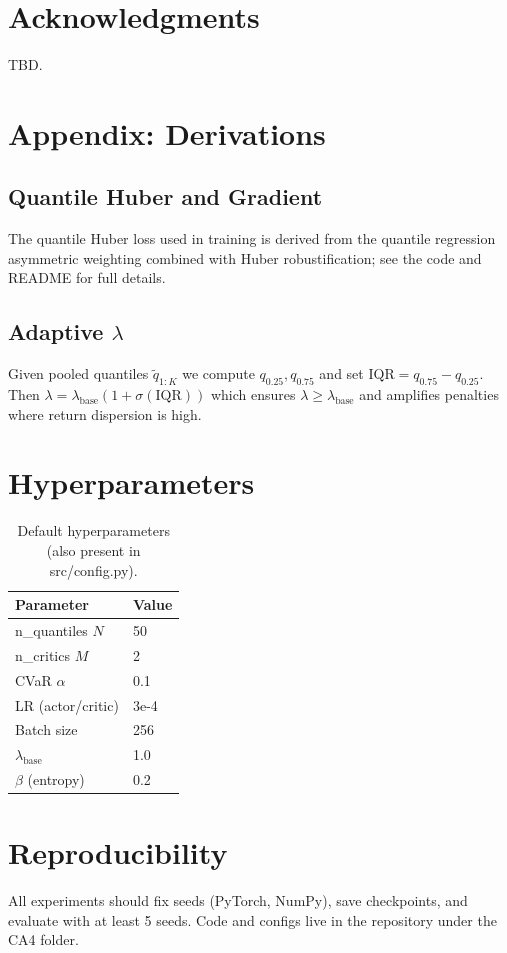 \documentclass{article}
\begin{document}
\section*{Acknowledgments}
TBD.

\appendix
\section{Appendix: Derivations}
\subsection{Quantile Huber and Gradient}
The quantile Huber loss used in training is derived from the quantile regression asymmetric weighting combined with Huber robustification; see the code and README for full details.

\subsection{Adaptive $\lambda$}
Given pooled quantiles $\tilde q_{1:K}$ we compute $q_{0.25}, q_{0.75}$ and set $\mathrm{IQR}=q_{0.75}-q_{0.25}$. Then $\lambda=\lambda_\text{base}(1+\sigma(\mathrm{IQR}))$ which ensures $\lambda\ge\lambda_\text{base}$ and amplifies penalties where return dispersion is high.

\section{Hyperparameters}
\begin{table}[h]
\centering
\begin{tabular}{ll}
\toprule
Parameter & Value \\
\midrule
n\_quantiles $N$ & 50 \\
n\_critics $M$ & 2 \\
CVaR $\alpha$ & 0.1 \\
LR (actor/critic) & 3e-4 \\
Batch size & 256 \\
$\lambda_\text{base}$ & 1.0 \\
$\beta$ (entropy) & 0.2 \\
\bottomrule
\end{tabular}
\caption{Default hyperparameters (also present in src/config.py).}
\end{table}

\section{Reproducibility}
All experiments should fix seeds (PyTorch, NumPy), save checkpoints, and evaluate with at least 5 seeds. Code and configs live in the repository under the CA4 folder.



\end{document}

